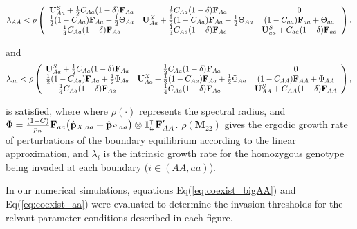 \documentclass[11pt]{article}
\def\mbf#1{\mathbf{#1}}
\newcommand{\tr}{{\mbox{\tiny \sf T}}}
\begin{document}
{\footnotesize
\begin{equation} \label{eq:coexist_bigAA}
	\lambda_{AA} < 
			\rho\left(\begin{array}{ccc}
\mathbf{U}^S_{Aa} +\frac{1}{2} C_{Aa} (1 - \delta) \mbf{F}_{Aa} & \frac{1}{2} C_{Aa} (1 - \delta) \mbf{F}_{Aa}  & 0 \\
 \frac{1}{2} (1 - C_{Aa}) \mbf{F}_{Aa}+\frac{1}{2}  \Theta_{Aa} &\mathbf{U}^X_{Aa} + \frac{1}{2} (1 - C_{Aa}) \mbf{F}_{Aa} +\frac{1}{2}\Theta_{Aa} & (1-C_{aa})\mbf{F}_{aa} + \Theta_{aa}\\
  \frac{1}{4} C_{Aa} (1 - \delta) \mbf{F}_{Aa} & \frac{1}{4} C_{Aa} (1 - \delta) \mbf{F}_{Aa}  &\mathbf{U}^S_{aa} +C_{aa} (1 - \delta) \mbf{F}_{aa}  \\ 
			\end{array} \right), \\ 
\end{equation} 

\noindent and
\begin{equation} \label{eq:coexist_aa}
	\lambda_{aa} < 
			\rho\left(\begin{array}{ccc}
\mathbf{U}^S_{Aa} +\frac{1}{2} C_{Aa} (1 - \delta) \mbf{F}_{Aa} & \frac{1}{2} C_{Aa} (1 - \delta) \mbf{F}_{Aa}  & 0 \\
 \frac{1}{2} (1 - C_{Aa}) \mbf{F}_{Aa}+\frac{1}{2 } \Phi_{Aa} &\mathbf{U}^X_{Aa} + \frac{1}{2} (1 - C_{Aa}) \mbf{F}_{Aa} +\frac{1}{2} \Phi_{Aa} & (1-C_{AA})\mbf{F}_{AA} + \Phi_{AA}\\
  \frac{1}{4} C_{Aa} (1 - \delta) \mbf{F}_{Aa} & \frac{1}{4} C_{Aa} (1 - \delta) \mbf{F}_{Aa}  &\mathbf{U}^S_{AA} + C_{AA} (1 - \delta) \mbf{F}_{AA}  \\ 
			\end{array} \right), \\ 
\end{equation} 
}

\noindent is satisfied, where where $\rho(\cdot)$ represents the spectral radius, and $\Phi = \frac{(1 - C)}{p_{n}} \mbf{F}_{aa} \big(\hat{\mbf{p}}_{X,aa}+ \hat{\mbf{p}}_{S,aa}  \big) \otimes \mathbf{1}^\tr_{\omega} \mathbf{F}_{AA}^\prime$. $\rho(\mbf{M}_{22})$ gives the ergodic growth rate of perturbations of the boundary equilibrium according to the linear approximation, and $\lambda_i$ is the intrinsic growth rate for the homozygous genotype being invaded at each boundary ($i \in (AA,aa)$). 

In our numerical simulations, equations Eq(\ref{eq:coexist_bigAA}) and Eq(\ref{eq:coexist_aa}) were evaluated to determine the invasion thresholds for the relvant parameter conditions described in each figure.
\end{document}
